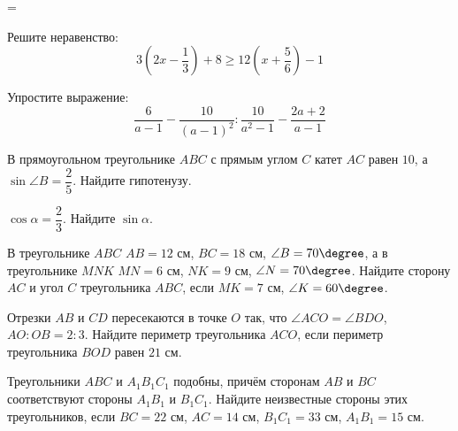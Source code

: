 =%
\begin{exam}
	\begin{listofex}
		\item Решите неравенство:
		\[3\left( 2x-\dfrac{1}{3} \right)+8\ge12\left( x+\dfrac{5}{6} \right)-1\]
		\item Упростите выражение:
		\[\dfrac{6}{a-1}-\dfrac{10}{(a-1)^2}:\dfrac{10}{a^2-1}-\dfrac{2a+2}{a-1}\]
		\item В прямоугольном треугольнике \( ABC \) с прямым углом \( C \) катет \( AC \) равен \( 10 \), а \( \sin\angle B=\dfrac{2}{5} \). Найдите гипотенузу.
		\item \( \cos\alpha=\dfrac{2}{3} \). Найдите \( \sin\alpha \).
		\item В треугольнике \( ABC \) \( AB=12 \) см, \( BC=18 \) см, \( \angle B=70\degree \), а в треугольнике \( MNK \) \( MN=6 \) см, \( NK=9 \) см, \( \angle N=70\degree \). Найдите сторону \( AC \) и угол \( C \) треугольника \( ABC \), если \( MK=7 \) см, \( \angle K=60\degree \).
		\item Отрезки \( AB \) и \( CD \) пересекаются в точке \( O \) так, что \( \angle ACO=\angle BDO \), \( AO:OB=2:3 \). Найдите периметр треугольника \( ACO \), если периметр треугольника \( BOD \) равен \( 21 \) см.
		\item Треугольники \( ABC \) и \( A_1B_1C_1 \) подобны, причём сторонам \( AB \) и \( BC \) соответствуют стороны \( A_1B_1 \) и \( B_1C_1 \). Найдите неизвестные стороны этих треугольников, если \( BC=22 \) см, \( AC=14 \) см, \( B_1C_1=33 \) см, \( A_1B_1=15 \) см.
	\end{listofex}
\end{exam}
